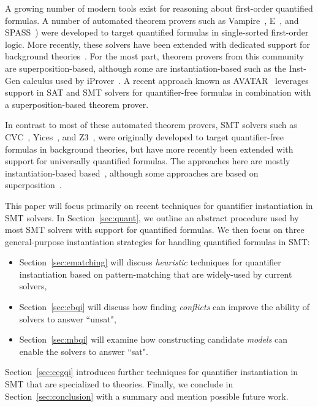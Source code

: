 \documentclass[oribibl]{llncs}
\begin{document}
A growing number of modern tools exist for reasoning about first-order quantified formulas.
A number of automated theorem provers
such as Vampire~\cite{DBLP:conf/cav/KovacsV13}, E~\cite{schulz2002brainiac}, and SPASS~\cite{weidenbach2009spass})
were developed to target quantified formulas in single-sorted first-order logic.
More recently, these solvers have been extended with dedicated support for background theories~\cite{}.
For the most part, theorem provers from this community are superposition-based,
although some are instantiation-based such as the Inst-Gen calculus used by iProver~\cite{ganzinger2003new}.
A recent approach known as AVATAR~\cite{DBLP:conf/cade/RegerSV15} leverages support in SAT and SMT solvers for quantifier-free formulas
in combination with a superposition-based theorem prover.

In contrast to most of these automated theorem provers, 
SMT solvers such as CVC~\cite{stump2002cvc}, Yices~\cite{dutertre2006yices}, and Z3~\cite{Z3}, 
were originally developed to target quantifier-free formulas in background theories,
but have more recently been extended with support for universally quantified formulas.
The approaches here are mostly instantiation-based based~\cite{Detlefs03simplify:a,MouraBjoerner07,GeBarrettTinelli07},
although some approaches are based on superposition~\cite{de2008engineering}.

This paper will focus primarily on recent techniques for quantifier instantiation in SMT solvers.
In Section~\ref{sec:quant}, we outline an abstract procedure used by most SMT solvers with support for quantified formulas.
We then focus on three general-purpose instantiation strategies for handling quantified formulas in SMT:
\begin{itemize}
\item Section~\ref{sec:ematching} will discuss \emph{heuristic} techniques for quantifier instantiation based on pattern-matching that
are widely-used by current solvers,
\item Section~\ref{sec:cbqi} will discuss how finding \emph{conflicts} can improve the ability of solvers to answer ``unsat",
\item Section~\ref{sec:mbqi} will examine how constructing candidate \emph{models} can enable the solvers to answer ``sat".
\end{itemize} 
Section~\ref{sec:cegqi} introduces further techniques for quantifier instantiation in SMT that 
are specialized to theories.
Finally, we conclude in Section~\ref{sec:conclusion} with a summary and mention possible future work.
\end{document}
